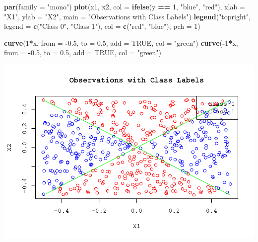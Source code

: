 \documentclass[
]{article}
\newenvironment{Shaded}{\begin{snugshade}}{\end{snugshade}}
\newcommand{\AttributeTok}[1]{\textcolor[rgb]{0.13,0.29,0.53}{#1}}
\newcommand{\ConstantTok}[1]{\textcolor[rgb]{0.56,0.35,0.01}{#1}}
\newcommand{\DecValTok}[1]{\textcolor[rgb]{0.00,0.00,0.81}{#1}}
\newcommand{\FloatTok}[1]{\textcolor[rgb]{0.00,0.00,0.81}{#1}}
\newcommand{\FunctionTok}[1]{\textcolor[rgb]{0.13,0.29,0.53}{\textbf{#1}}}
\newcommand{\NormalTok}[1]{#1}
\newcommand{\SpecialCharTok}[1]{\textcolor[rgb]{0.81,0.36,0.00}{\textbf{#1}}}
\newcommand{\StringTok}[1]{\textcolor[rgb]{0.31,0.60,0.02}{#1}}
\begin{document}
\begin{Shaded}
\begin{Highlighting}[]
\FunctionTok{par}\NormalTok{(}\AttributeTok{family =} \StringTok{"mono"}\NormalTok{)}
\FunctionTok{plot}\NormalTok{(x1, x2, }\AttributeTok{col =} \FunctionTok{ifelse}\NormalTok{(y }\SpecialCharTok{==} \DecValTok{1}\NormalTok{, }\StringTok{"blue"}\NormalTok{, }\StringTok{"red"}\NormalTok{), }\AttributeTok{xlab =} \StringTok{"X1"}\NormalTok{, }\AttributeTok{ylab =} \StringTok{"X2"}\NormalTok{, }\AttributeTok{main =} \StringTok{"Observations with Class Labels"}\NormalTok{)}
\FunctionTok{legend}\NormalTok{(}\StringTok{"topright"}\NormalTok{, }\AttributeTok{legend =} \FunctionTok{c}\NormalTok{(}\StringTok{"Class 0"}\NormalTok{, }\StringTok{"Class 1"}\NormalTok{), }\AttributeTok{col =} \FunctionTok{c}\NormalTok{(}\StringTok{"red"}\NormalTok{, }\StringTok{"blue"}\NormalTok{), }\AttributeTok{pch =} \DecValTok{1}\NormalTok{)}

\FunctionTok{curve}\NormalTok{(}\DecValTok{1}\SpecialCharTok{*}\NormalTok{x, }\AttributeTok{from =} \SpecialCharTok{{-}}\FloatTok{0.5}\NormalTok{, }\AttributeTok{to =} \FloatTok{0.5}\NormalTok{, }\AttributeTok{add =} \ConstantTok{TRUE}\NormalTok{, }\AttributeTok{col =} \StringTok{"green"}\NormalTok{)}
\FunctionTok{curve}\NormalTok{(}\SpecialCharTok{{-}}\DecValTok{1}\SpecialCharTok{*}\NormalTok{x, }\AttributeTok{from =} \SpecialCharTok{{-}}\FloatTok{0.5}\NormalTok{, }\AttributeTok{to =} \FloatTok{0.5}\NormalTok{, }\AttributeTok{add =} \ConstantTok{TRUE}\NormalTok{, }\AttributeTok{col =} \StringTok{"green"}\NormalTok{)}
\end{Highlighting}
\end{Shaded}

\includegraphics{ISLR4.7.10_files/figure-latex/unnamed-chunk-18-1.pdf}
\end{document}
